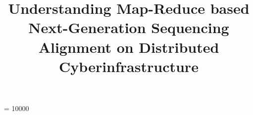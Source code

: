 \documentclass{sig-alternate}
\begin{document}
 {}
\widowpenalty = 10000



\newif\ifdraft
\drafttrue                                                                                                   

\ifdraft
 \newcommand{\jkimnote}[1]{{\textcolor{green}   { ***Joohyun:   #1 }}}
 \newcommand{\jhanote}[1]{  {\textcolor{red}     { ***SJ: #1 }}}
  \newcommand{\pmnote}[1]{  {\textcolor{red}     { ***Pradeep: #1 }}}
 \newcommand{\todo}[1]{  {\textcolor{red}     { ***TODO: #1 }}}
 \newcommand{\fix}[1]{  {\textcolor{red}     { ***FIX: #1 }}}
 \newcommand{\reviewer}[1]{}
\else
 \newcommand{\reviewer}[1]{}
 \newcommand{\jkimnote}[1]{}
 \newcommand{\pmnote}[1]{}
 \newcommand{\jhanote}[1]{}
 \newcommand{\todo}[1]{  {\textcolor{red}     { ***TODO: #1 }}}
 \newcommand{\fix}[1]{}                                                                                     
\fi

\title{Understanding Map-Reduce based Next-Generation Sequencing
  Alignment on Distributed Cyberinfrastructure}

\end{document}
